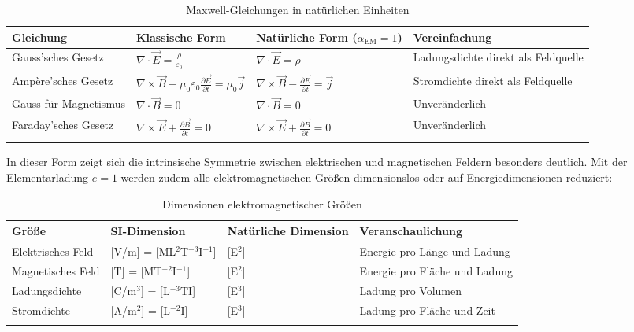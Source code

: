 \documentclass[12pt,a4paper]{article}
\newcommand{\alphaEM}{\alpha_{\text{EM}}}
\begin{document}
	\begin{table}[ht]
		\centering
		\begin{adjustbox}{scale=0.75}
			\begin{tabular}{llll}
				\hline
				\textbf{Gleichung} & \textbf{Klassische Form} & \textbf{Natürliche Form ($\alphaEM = 1$)} & \textbf{Vereinfachung} \\
				\hline
				Gauss'sches Gesetz & $\nabla\cdot\vec{E} = \frac{\rho}{\varepsilon_0}$ & $\nabla\cdot\vec{E} = \rho$ & Ladungsdichte direkt als Feldquelle \\
				Ampère'sches Gesetz & $\nabla\times\vec{B} - \mu_0\varepsilon_0\frac{\partial\vec{E}}{\partial t} = \mu_0\vec{j}$ & $\nabla\times\vec{B} - \frac{\partial\vec{E}}{\partial t} = \vec{j}$ & Stromdichte direkt als Feldquelle \\
				Gauss für Magnetismus & $\nabla\cdot\vec{B} = 0$ & $\nabla\cdot\vec{B} = 0$ & Unveränderlich \\
				Faraday'sches Gesetz & $\nabla\times\vec{E} + \frac{\partial\vec{B}}{\partial t} = 0$ & $\nabla\times\vec{E} + \frac{\partial\vec{B}}{\partial t} = 0$ & Unveränderlich \\
				\hline
			\multicolumn{3}{c}{} \\
				\hline
			\end{tabular}
		\end{adjustbox}
		\caption{Maxwell-Gleichungen in natürlichen Einheiten }
		\label{tab:maxwell}
	\end{table}
	
	In dieser Form zeigt sich die intrinsische Symmetrie zwischen elektrischen und magnetischen Feldern besonders deutlich. Mit der Elementarladung $e = 1$ werden zudem alle elektromagnetischen Größen dimensionslos oder auf Energiedimensionen reduziert:
	
	\begin{table}[ht]
		\centering
		\begin{adjustbox}{scale=0.85}
			\begin{tabular}{llll}
				\hline
				\textbf{Größe} & \textbf{SI-Dimension} & \textbf{Natürliche Dimension} & \textbf{Veranschaulichung} \\
				\hline
				Elektrisches Feld & [V/m] = [ML$^2$T$^{-3}$I$^{-1}$] & [E$^2$] & Energie pro Länge und Ladung \\
				Magnetisches Feld & [T] = [MT$^{-2}$I$^{-1}$] & [E$^2$] & Energie pro Fläche und Ladung \\
				Ladungsdichte & [C/m$^3$] = [L$^{-3}$TI] & [E$^3$] & Ladung pro Volumen \\
				Stromdichte & [A/m$^2$] = [L$^{-2}$I] & [E$^3$] & Ladung pro Fläche und Zeit \\
				\hline
			 \multicolumn{3}{c}{} \\
				\hline
			\end{tabular}
		\end{adjustbox}
		\caption{Dimensionen elektromagnetischer Größen}
		\label{tab:em_dimensions}
	\end{table}
	
\end{document}
